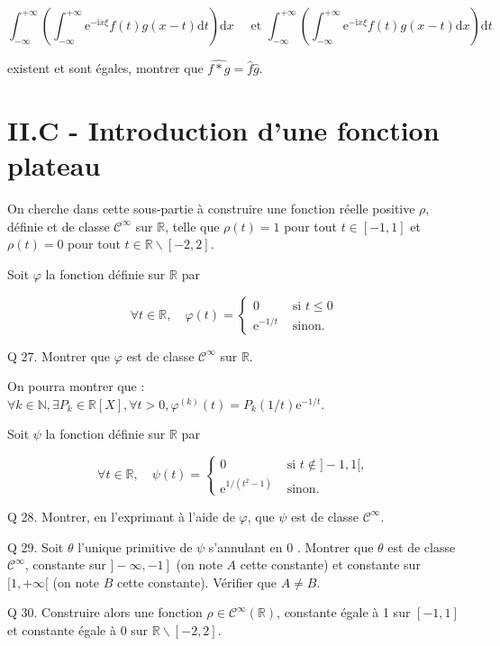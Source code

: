 \documentclass[10pt]{article}
\begin{document}
$$
\int_{-\infty}^{+\infty}\left(\int_{-\infty}^{+\infty} \mathrm{e}^{-\mathrm{i} x \xi} f(t) g(x-t) \mathrm{d} t\right) \mathrm{d} x \quad \text { et } \int_{-\infty}^{+\infty}\left(\int_{-\infty}^{+\infty} \mathrm{e}^{-\mathrm{i} x \xi} f(t) g(x-t) \mathrm{d} x\right) \mathrm{d} t
$$

existent et sont égales, montrer que $\widehat{f * g}=\hat{f} \hat{g}$.

\section{II.C - Introduction d'une fonction plateau}
On cherche dans cette sous-partie à construire une fonction réelle positive $\rho$, définie et de classe $\mathcal{C}^{\infty}$ sur $\mathbb{R}$, telle que $\rho(t)=1$ pour tout $t \in[-1,1]$ et $\rho(t)=0$ pour tout $t \in \mathbb{R} \backslash[-2,2]$.

Soit $\varphi$ la fonction définie sur $\mathbb{R}$ par

$$
\forall t \in \mathbb{R}, \quad \varphi(t)= \begin{cases}0 & \text { si } t \leqslant 0 \\ \mathrm{e}^{-1 / t} & \text { sinon. }\end{cases}
$$

Q 27. Montrer que $\varphi$ est de classe $\mathcal{C}^{\infty}$ sur $\mathbb{R}$.

On pourra montrer que : $\forall k \in \mathbb{N}, \exists P_{k} \in \mathbb{R}[X], \forall t>0, \varphi^{(k)}(t)=P_{k}(1 / t) \mathrm{e}^{-1 / t}$.

Soit $\psi$ la fonction définie sur $\mathbb{R}$ par

$$
\forall t \in \mathbb{R}, \quad \psi(t)= \begin{cases}0 & \text { si } t \notin]-1,1[, \\ \mathrm{e}^{1 /\left(t^{2}-1\right)} & \text { sinon. }\end{cases}
$$

Q 28. Montrer, en l'exprimant à l'aide de $\varphi$, que $\psi$ est de classe $\mathcal{C}^{\infty}$.

Q 29. Soit $\theta$ l'unique primitive de $\psi$ s'annulant en 0 . Montrer que $\theta$ est de classe $\mathcal{C}^{\infty}$, constante sur $\left.]-\infty,-1\right]$ (on note $A$ cette constante) et constante sur $[1,+\infty[$ (on note $B$ cette constante). Vérifier que $A \neq B$.

Q 30. Construire alors une fonction $\rho \in \mathcal{C}^{\infty}(\mathbb{R})$, constante égale à 1 sur $[-1,1]$ et constante égale à 0 sur $\mathbb{R} \backslash[-2,2]$.
\end{document}
